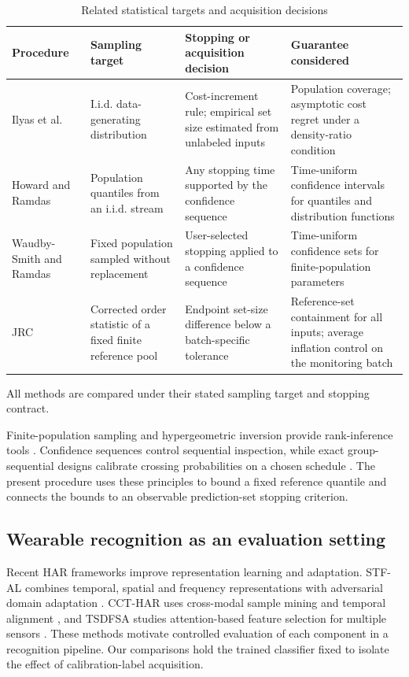 \documentclass[preprint,12pt]{elsarticle}
\makeatletter
\newcommand{\botrule}{\bottomrule}
\newcommand{\raggedtablecolumns}{\let\savedarrayrestore\@arrayparboxrestore\def\@arrayparboxrestore{\savedarrayrestore\raggedright\arraybackslash}}
\makeatother
\begin{document}
\begin{table}[!htbp]
\centering\small\setlength{\tabcolsep}{4pt}
\raggedtablecolumns
\caption{Related statistical targets and acquisition decisions}\label{tab:related}
\begin{tabular}{p{24mm}p{38mm}p{42mm}p{44mm}}
\toprule
Procedure & Sampling target & Stopping or acquisition decision & Guarantee considered \\
\midrule
Ilyas et al.\ \cite{ilyas} & I.i.d. data-generating distribution & Cost-increment rule; empirical set size estimated from unlabeled inputs & Population coverage; asymptotic cost regret under a density-ratio condition \\
Howard and Ramdas\ \cite{howard2022} & Population quantiles from an i.i.d. stream & Any stopping time supported by the confidence sequence & Time-uniform confidence intervals for quantiles and distribution functions \\
Waudby-Smith and Ramdas\ \cite{wor} & Fixed population sampled without replacement & User-selected stopping applied to a confidence sequence & Time-uniform confidence sets for finite-population parameters \\
JRC & Corrected order statistic of a fixed finite reference pool & Endpoint set-size difference below a batch-specific tolerance & Reference-set containment for all inputs; average inflation control on the monitoring batch \\
\botrule
\end{tabular}
\begin{minipage}{\textwidth}\footnotesize All methods are compared under their stated sampling target and stopping contract.\end{minipage}
\end{table}


Finite-population sampling and hypergeometric inversion provide rank-inference tools \cite{cochran}. Confidence sequences \cite{howard2021,howard2022,wor} control sequential inspection, while exact group-sequential designs calibrate crossing probabilities on a chosen schedule \cite{jin}. The present procedure uses these principles to bound a fixed reference quantile and connects the bounds to an observable prediction-set stopping criterion.

\subsection{Wearable recognition as an evaluation setting}

Recent HAR frameworks improve representation learning and adaptation. STF-AL combines temporal, spatial and frequency representations with adversarial domain adaptation \cite{stfal}. CCT-HAR uses cross-modal sample mining and temporal alignment \cite{ccthar}, and TSDFSA studies attention-based feature selection for multiple sensors \cite{tsdfsa}. These methods motivate controlled evaluation of each component in a recognition pipeline. Our comparisons hold the trained classifier fixed to isolate the effect of calibration-label acquisition.
\end{document}
